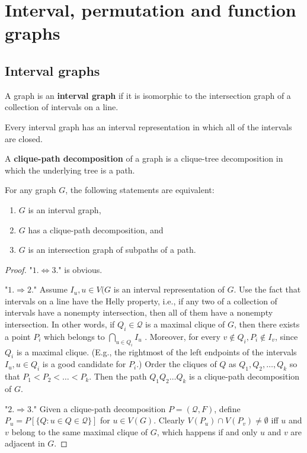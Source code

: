 \chapter{Interval, permutation and function graphs}

\section{Interval graphs}

\begin{defn}
	A graph is an \textbf{interval graph} if it is isomorphic to the intersection graph of a collection of intervals on a line.
\end{defn}

\begin{observ}
	Every interval graph has an interval representation in which all of the intervals are closed.
\end{observ}

\begin{defn}
	A \textbf{clique-path decomposition} of a graph is a clique-tree decomposition in which the underlying tree is a path.
\end{defn}

\begin{thm}
	For any graph $G$, the following statements are equivalent:
	
	\begin{enumerate}
		\item $G$ is an interval graph,
		\item $G$ has a clique-path decomposition, and
		\item $G$ is an intersection graph of subpaths of a path.
	\end{enumerate}
\end{thm}

\begin{proof}
	"$1. \Leftrightarrow 3.$" is obvious.
	
	"$1. \Rightarrow 2.$" Assume $I_u , u \in V(G$ is an interval representation of $G$. Use the fact that intervals on a line have the Helly property, i.e., if any two of a collection of intervals have a nonempty intersection, then all of them have a nonempty intersection. In other words, if $Q_i \in \mathcal{Q}$ is a maximal clique of $G$, then there exists a point $P_i$ which belongs to $\bigcap_{u \in Q_i} I_u$ . Moreover, for every $v \notin Q_i , P_i \notin I_v$, since $Q_i$ is a maximal clique. (E.g., the rightmost of the left endpoints of the intervals $I_u , u \in Q_i$ is a good candidate for $P_i$.) Order the cliques of $Q$ as $Q_1, Q_2, \dots, Q_k$ so that $P_1 < P_2 < \dots < P_k$. Then the path
	$Q_1 Q_2 \dots Q_k$ is a clique-path decomposition of $G$.
	
	"$2. \Rightarrow 3.$" Given a clique-path decomposition $P = (\mathcal{Q}, F)$, define $P_u = P [\{Q : u \in Q \in \mathcal{Q}\}]$ for $u \in V(G)$. Clearly $V(P_u) \cap V(P_v) \neq \emptyset$ iff $u$ and $v$ belong to the same maximal clique of $G$, which happens if and only $u$ and $v$ are adjacent in $G$.
\end{proof}

